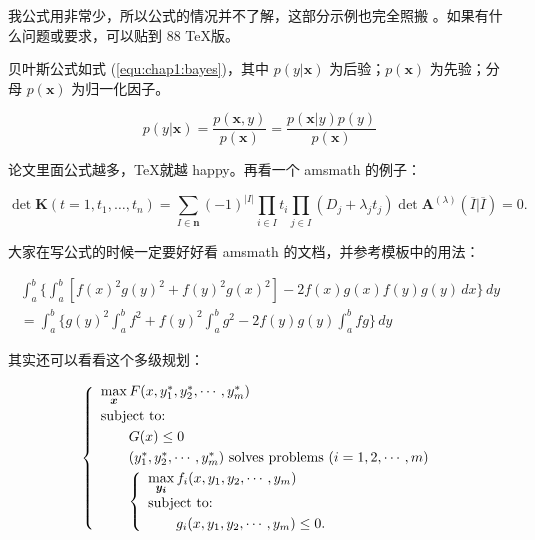 我公式用非常少，所以公式的情况并不了解，这部分示例也完全照搬 。如果有什么问题或要求，可以贴到 88 \TeX 版。

贝叶斯公式如式 (\ref{equ:chap1:bayes})，其中 $p(y|\mathbf{x})$ 为后验；$p(\mathbf{x})$ 为先验；分母 $p(\mathbf{x})$ 为归一化因子。

\begin{equation}
\label{equ:chap1:bayes}
p(y|\mathbf{x}) = \frac{p(\mathbf{x},y)}{p(\mathbf{x})}=
\frac{p(\mathbf{x}|y)p(y)}{p(\mathbf{x})} 
\end{equation}

论文里面公式越多，\TeX 就越 happy。再看一个 \textsf{amsmath} 的例子：

\newcommand{\envert}[1]{\left\lvert#1\right\rvert} 

\begin{equation}\label{detK2}
\det\mathbf{K}(t=1,t_1,\dots,t_n)=\sum_{I\in\mathbf{n}}(-1)^{\envert{I}}
\prod_{i\in I}t_i\prod_{j\in I}(D_j+\lambda_jt_j)\det\mathbf{A}
^{(\lambda)}(\overline{I}|\overline{I})=0.
\end{equation} 

大家在写公式的时候一定要好好看 \textsf{amsmath} 的文档，并参考模板中的用法：

\begin{multline*}\tag{[b]} %
\int_a^b\biggl\{\int_a^b[f(x)^2g(y)^2+f(y)^2g(x)^2]
 -2f(x)g(x)f(y)g(y)\,dx\biggr\}\,dy \\
 =\int_a^b\biggl\{g(y)^2\int_a^bf^2+f(y)^2
  \int_a^b g^2-2f(y)g(y)\int_a^b fg\biggr\}\,dy
\end{multline*}

其实还可以看看这个多级规划：

\begin{equation}\label{bilevel}
\left\{\begin{array}{l}
\max\limits_{{\mbox{\footnotesize\boldmath $x$}}} F(x,y_1^*,y_2^*,\cdots,y_m^*)\\[0.2cm]
\mbox{subject to:}\\[0.1cm]
\qquad G(x)\le 0\\[0.1cm]
\qquad(y_1^*,y_2^*,\cdots,y_m^*)\mbox{ solves problems }(i=1,2,\cdots,m)\\[0.1cm]
\qquad\left\{\begin{array}{l}
    \max\limits_{{\mbox{\footnotesize\boldmath $y_i$}}}f_i(x,y_1,y_2,\cdots,y_m)\\[0.2cm]
    \mbox{subject to:}\\[0.1cm]
    \qquad g_i(x,y_1,y_2,\cdots,y_m)\le 0.
    \end{array}\right.
\end{array}\right.
\end{equation}


